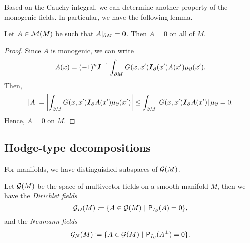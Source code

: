 Based on the Cauchy integral, we can determine another property of the monogenic fields. In particular, we have the following lemma.

\begin{lemma}
\label{lem:monogenic_zero}
Let $A \in \mathcal{M}^{}(M)$ be such that $A\vert_{\partial M} = 0$. Then $A=0$ on all of $M$.
\end{lemma}
\begin{proof}
Since $A$ is monogenic, we can write
\begin{equation}
A(x) = (-1)^n \boldsymbol{I}^{-1} \int_{\partial M} G(x,x') \boldsymbol{I}_\partial(x') A(x') \mu_\partial(x').
\end{equation}
Then,
\begin{equation}
|A| = \left| \int_{\partial M} G(x,x') \boldsymbol{I}_\partial A(x') \mu_\partial(x')\right| \leq \int_{\partial M} \left| G(x,x') \boldsymbol{I}_\partial A(x')\right| \mu_\partial = 0.
\end{equation}
Hence, $A=0$ on $M$.
\end{proof}




\subsection{Hodge-type decompositions}

For manifolds, we have distinguished subspaces of $\mathcal{G}(M)$. 
\begin{definition}
\label{def:dirichlet_neumann}
Let $\mathcal{G}(M)$ be the space of multivector fields on a smooth manifold $M$, then we have the \emph{Dirichlet fields}
\begin{equation}
\mathcal{G}_D(M) \coloneqq \{A \in \mathcal{G}(M) ~\vert~ \mathsf{P}_{I_{\partial}}(A) = 0 \},
\end{equation}
and the \emph{Neumann fields}
\begin{equation}
\mathcal{G}_N(M) \coloneqq \{A \in \mathcal{G}(M) ~\vert~ \mathsf{P}_{I_{\partial}}(A^\perp) = 0 \}.
\end{equation}
\end{definition}

